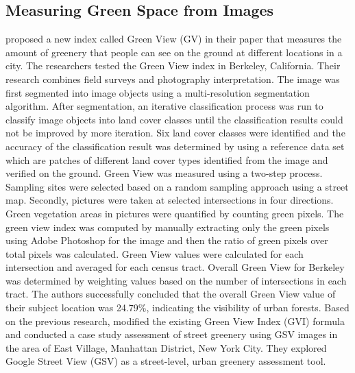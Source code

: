 \subsection{Measuring Green Space from Images}
  proposed a new index called Green View (GV) in their paper that measures the amount of greenery that people can see on the ground at different locations in a city. The researchers tested the Green View index in Berkeley, California. Their research combines field surveys and photography interpretation.
The image was first segmented into image objects using a
multi-resolution segmentation algorithm. After segmentation, an
iterative classification process was run to classify image objects
into land cover classes until the classification results could not be
improved by more iteration. Six land cover classes were identified and the accuracy of the classification
result was determined by using a reference data set which are patches
of different land cover types identified from the image and verified
on the ground.
Green View was measured using a two-step process.
Sampling sites were selected based on a random sampling approach using a street map.
Secondly, 
pictures were taken at selected intersections in four directions.
Green vegetation areas in pictures were quantified by counting green pixels. 
The green view index was computed by manually extracting only the green pixels using Adobe Photoshop for the image and then the ratio of green pixels over total pixels was calculated. 
Green View values were calculated for each intersection and averaged for each census tract.
Overall Green View for Berkeley was determined by weighting values based on the number of intersections in each tract.
The authors successfully concluded that the overall Green View value of their subject location was 24.79\%, indicating the visibility of urban forests.
\newline
Based on the previous research,  modified the existing Green View Index (GVI) formula and conducted a case study assessment of street greenery using GSV images in the area of East Village, Manhattan District, New York City. They explored Google Street View (GSV) as a street-level, urban greenery assessment tool. 

